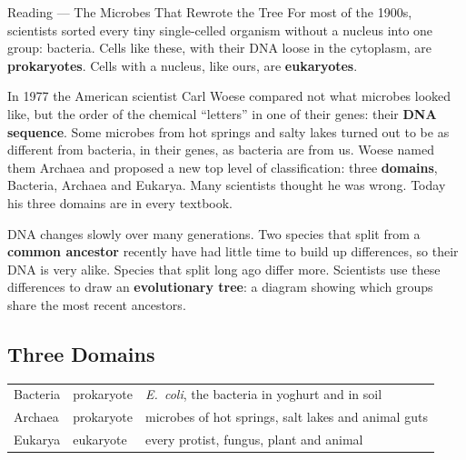 \begin{readingbox}{Reading --- The Microbes That Rewrote the Tree}
For most of the 1900s, scientists sorted every tiny single-celled organism without a nucleus into one group: bacteria. Cells like these, with their DNA loose in the cytoplasm, are \textbf{prokaryotes}. Cells with a nucleus, like ours, are \textbf{eukaryotes}.

In 1977 the American scientist Carl Woese compared not what microbes looked like, but the order of the chemical ``letters'' in one of their genes: their \textbf{DNA sequence}. Some microbes from hot springs and salty lakes turned out to be as different from bacteria, in their genes, as bacteria are from us. Woese named them Archaea and proposed a new top level of classification: three \textbf{domains}, Bacteria, Archaea and Eukarya. Many scientists thought he was wrong. Today his three domains are in every textbook.

DNA changes slowly over many generations. Two species that split from a \textbf{common ancestor} recently have had little time to build up differences, so their DNA is very alike. Species that split long ago differ more. Scientists use these differences to draw an \textbf{evolutionary tree}: a diagram showing which groups share the most recent ancestors.
\end{readingbox}

\rcreset
{}

\label{theory:2}

\subsection{Three Domains}\label{sub:a2.1}

\begin{ctab}
\begin{tabular}{|C{2.3cm}|W{2.6cm}|W{5.3cm}|}
  \hline{} &  &  \\ \hline
  Bacteria & prokaryote & \textit{E.\ coli}, the bacteria in yoghurt and in soil \\ \hline
  Archaea & prokaryote & microbes of hot springs, salt lakes and animal guts \\ \hline
  Eukarya & eukaryote & every protist, fungus, plant and animal \\ \hline
\end{tabular}
\end{ctab}

